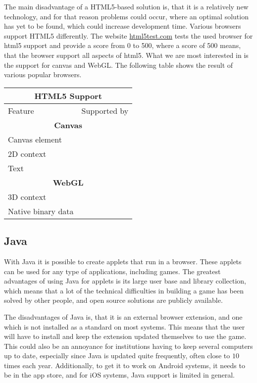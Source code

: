 The main disadvantage of a HTML5-based solution is, that it is a relatively new technology, and for that reason problems could occur, where an optimal solution has yet to be found, which could increase development time. Various browsers support HTML5 differently. The website \url{html5test.com} tests the used browser for html5 support and provide a score from 0 to 500, where a score of 500 means, that the browser support all aspects of html5. What we are most interested in is the support for canvas and WebGL. The following table shows the result of various popular browsers.

\begin{center}
\begin{tabular}{|l|l|}
\hline
\multicolumn{2}{|c|}{HTML5 Support}\\
\hline
Feature & Supported by \\ \hline

\multicolumn{2}{|c|}{\textbf{Canvas}} \\ \hline
Canvas element &  \\
2D context     &  \\
Text           &  \\ \hline
\multicolumn{2}{|c|}{\textbf{WebGL}}  \\ \hline
3D context & \\
Native binary data & \\\hline
\end{tabular}
\end{center}

\subsection{Java}
With Java it is possible to create applets that run in a browser.\cite{java13} These applets can be used for any type of applications, including games.
The greatest advantages of using Java for applets is its large user base and library collection, which means that a lot of the technical difficulties in building a game has been solved by other people, and open source solutions are publicly available.

The disadvantages of Java is, that it is an external browser extension, and one which is not installed as a standard on most systems.
This means that the user will have to install and keep the extension updated themselves to use the game. 
This could also be an annoyance for institutions having to keep several computers up to date, especially since Java is updated quite frequently, often close to $10$ times each year.\cite{javahistory13}
Additionally, to get it to work on Android systems, it needs to be in the app store, and for iOS systems, Java support is limited in general.

